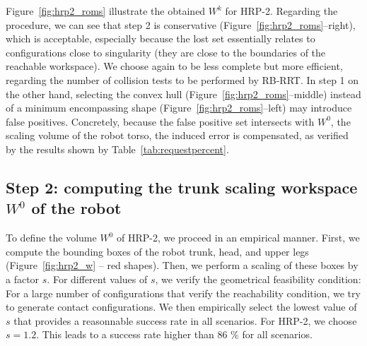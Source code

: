 Figure~\ref{fig:hrp2_roms} illustrate the obtained $W^k$ for HRP-2.
Regarding the procedure, we can see that step 2 is conservative (Figure~\ref{fig:hrp2_roms}--right), which 
is acceptable, especially because the lost set essentially relates to configurations close to singularity (they are close to the boundaries of the reachable workspace). We choose again to be less complete
but more efficient, regarding the number of collision tests to be performed by RB-RRT.
In step 1 on the other hand, selecting the convex hull (Figure~\ref{fig:hrp2_roms}--middle) instead of a minimum encompassing shape (Figure~\ref{fig:hrp2_roms}--left) may introduce false positives.
Concretely, because the false positive set intersects with $W^0$, the scaling volume of the robot torso, the induced error is compensated,
as verified by the results shown by Table~\ref{tab:requestpercent}.

\subsection{Step 2: computing the trunk scaling workspace $W^0$ of the robot}
To define the volume $W^0$ of HRP-2, we proceed in an empirical manner.
First, we compute the bounding boxes of the robot trunk, head, and upper legs (Figure~\ref{fig:hrp2_w} -- red shapes).
Then, we perform a scaling of these boxes by a factor $s$. For different values of $s$, we verify the geometrical feasibility condition:
For a large number of configurations that verify the reachability condition, we try to generate contact configurations. We then
empirically select the lowest value of $s$ that provides a reasonnable success rate in all scenarios.
For HRP-2, we choose $s=1.2$. This leads to a success rate higher than 86 \% for all scenarios.

